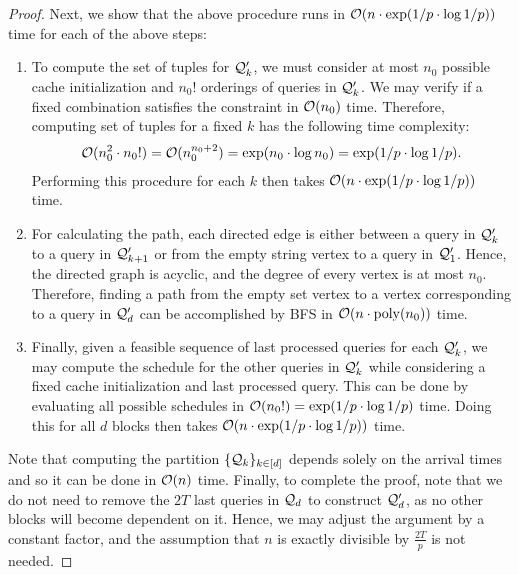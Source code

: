 \begin{proof}
    Next, we show that the above procedure runs in $\mathcal{O}(n \cdot \exp(1/p \cdot \log 1/p))$ time for each of the above steps:
    \begin{enumerate}
        \item To compute the set of tuples for $\mathcal{Q}_k'$, we must consider at most $n_0$ possible cache initialization and $n_0!$ orderings of queries in $\mathcal{Q}_k'$. We may verify if a fixed combination satisfies the constraint in $\mathcal{O}(n_0)$ time. Therefore, computing set of tuples for a fixed $k$ has the following time complexity:
        \begin{gather*}
            \mathcal{O}(n_0^2 \cdot n_0!)
            = \mathcal{O}(n_0^{n_0 + 2})
            = \exp(n_0 \cdot \log n_0)
            = \exp(1/p \cdot \log 1/p).
        \end{gather*}
        Performing this procedure for each $k$ then takes $\mathcal{O}(n \cdot \exp(1/p \cdot \log 1/p))$ time.
        \item For calculating the path, each directed edge is either between a query in $\mathcal{Q}_k'$ to a query in $\mathcal{Q}_{k+1}'$ or from the empty string vertex to a query in $\mathcal{Q}_1'$. Hence, the directed graph is acyclic, and the degree of every vertex is at most $n_0$. Therefore, finding a path from the empty set vertex to a vertex corresponding to a query in $\mathcal{Q}_d'$ can be accomplished by BFS in $\mathcal{O}(n \cdot \operatorname{poly}(n_0))$ time.
        \item Finally, given a feasible sequence of last processed queries for each $\mathcal{Q}_k'$, we may compute the schedule for the other queries in $\mathcal{Q}_k'$ while considering a fixed cache initialization and last processed query. This can be done by evaluating all possible schedules in $\mathcal{O}(n_0!) = \exp(1/p \cdot \log 1/p)$ time. Doing this for all $d$ blocks then takes $\mathcal{O}(n \cdot \exp(1/p \cdot \log 1/p))$ time.
    \end{enumerate}
    
    Note that computing the partition $\{\mathcal{Q}_k\}_{k \in [d]}$ depends solely on the arrival times and so it can be done in $\mathcal{O}(n)$ time. Finally, to complete the proof, note that we do not need to remove the $2T$ last queries in $\mathcal{Q}_d$ to construct $\mathcal{Q}_d'$, as no other blocks will become dependent on it. Hence, we may adjust the argument by a constant factor, and the assumption that $n$ is exactly divisible by $\frac{2T}{p}$ is not needed. 
\end{proof}
